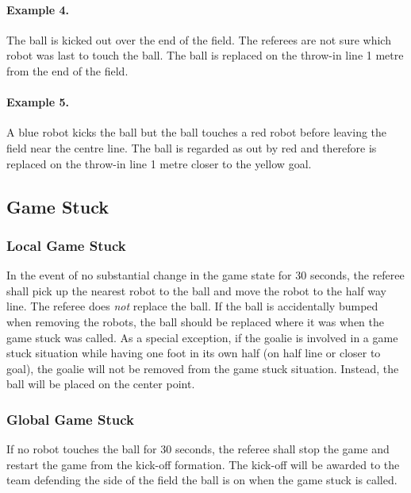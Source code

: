 \documentclass[12pt]{article}
\begin{document}
\paragraph{Example 4.} The ball is kicked out over the end of the field.  The
referees are not sure which robot was last to touch the ball.  The ball is
replaced on the throw-in line 1 metre from the end of the field.

\paragraph{Example 5.} A blue robot kicks the ball but the ball
touches a red robot before leaving the field near the centre line.
The ball is regarded as out by red and therefore
is replaced on the throw-in line 1 metre closer to the yellow goal.

\subsection{Game Stuck}
\subsubsection{Local Game Stuck}

In the event of no substantial change in the game state for 30
seconds, the referee shall pick up the nearest robot to the ball and move the robot
to the half way line.  The referee does \emph{not} replace the ball.
If the ball is accidentally bumped when removing the robots, the ball should be replaced where
it was when the game stuck was called.  As a special exception, if
the goalie is involved in a game stuck situation while having one foot
in its own half (on half line or closer to goal), the goalie will
not be removed from the game stuck situation. Instead, the ball will be placed on the center point.


\subsubsection{Global Game Stuck}
If no robot touches the ball for 30 seconds, the referee shall stop
the game and restart the game from the kick-off formation. The
kick-off will be awarded to the team defending the side of the field
the ball is on when the game stuck is called.
\end{document}
